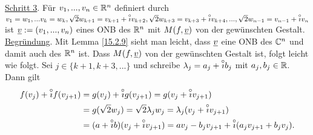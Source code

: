 \documentclass[../../main.tex]{subfiles}
\begin{document}
\begin{cproof}
\noindent\underline{Schritt 3}. Für $v_1,...,v_n\in \mathbb R^n$ definiert durch $v_1=w_1,...v_k=w_k, \sqrt{2}w_{k+1}=v_{k+1}+\overset\circ\imath v_{k+2},\sqrt{2}w_{k+3}=v_{k+3}+\overset\circ\imath v_{k+4},...,\sqrt{2}w_{n-1}=v_{n-1}+\overset\circ\imath v_n$ ist ${\underline v}:=(v_1,...,v_n)$ eines ONB des $\mathbb R^n$ mit $M(f,{\underline v})$ von der gewünschten Gestalt.\\
\noindent\underline{Begründung}. Mit Lemma \ref{15.2.9} sieht man leicht, dass ${\underline v}$ eine ONB des $\mathbb C^n$ und damit auch des $\mathbb R^n$ ist. Dass $M(f,{\underline v})$ von der gewünschten Gestalt ist, folgt leicht wie folgt. Sei $j\in\{k+1,k+3,...\}$ und schreibe $\lambda_j=a_j+\overset\circ\imath b_j$ mit $a_j,b_j\in \mathbb R$. Dann gilt
\begin{align*}
f(v_j)+\overset\circ\imath f(v_{j+1})&=g(v_j)+\overset\circ\imath g(v_{j+1})=g(v_j+\overset\circ\imath v_{j+1})\\
&=g(\sqrt{2}w_j)=\sqrt{2}\lambda_jw_j=\lambda_j(v_j+\overset\circ\imath v_{j+1})\\
&=(a+\overset\circ\imath b)(v_j+\overset\circ\imath v_{j+1})=av_j-b_jv_{j+1}+\overset\circ\imath(a_jv_{j+1}+b_jv_j).
\end{align*}
\end{cproof}
\end{document}
